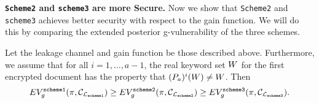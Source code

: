 \textbf{\texttt{Scheme2} and \texttt{scheme3} are more Secure.} Now we show that \texttt{Scheme2} and \texttt{scheme3} achieves better security with respect to the gain function. We will do this by comparing the extended posterior g-vulnerability of the three schemes.


\begin{theorem}
Let the leakage channel and gain function be those described above. Furthermore, we assume that for all $i = 1, \dots, a-1$, the real keyword set $W$ for the first encrypted document has the property that $(P_a)^i(W) \neq W$. Then
\begin{equation}
EV_g^{\texttt{scheme1}}(\pi, \mathcal{C}_{\mathcal{L}_\texttt{scheme1}}) \geq EV_g^{\texttt{scheme2}}(\pi, \mathcal{C}_{\mathcal{L}_\texttt{scheme2}}) \geq EV_g^{\texttt{scheme3}}(\pi, \mathcal{C}_{\mathcal{L}_\texttt{scheme3}}).
\end{equation}
\end{theorem}



